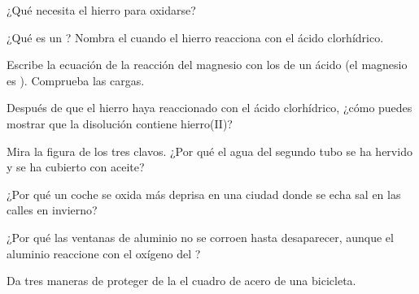 \begin{exercise}[$\star$]\label{exo:g9:metals-acids-corrosion:3}
¿Qué necesita el hierro para oxidarse?
\end{exercise}

\begin{exercise}[$\star$]\label{exo:g9:metals-acids-corrosion:4}
¿Qué es un ? Nombra el  cuando el hierro
reacciona con el ácido clorhídrico.
\end{exercise}

\begin{exercise}[$\star\star$]\label{exo:g9:metals-acids-corrosion:5}
Escribe la ecuación de la reacción del magnesio con los   de
un ácido (el  magnesio es ). Comprueba las cargas.
\end{exercise}

\begin{exercise}[$\star\star$]\label{exo:g9:metals-acids-corrosion:6}
Después de que el hierro haya reaccionado con el ácido clorhídrico,
¿cómo puedes mostrar que la disolución contiene  hierro(II)?
\end{exercise}

\begin{exercise}[$\star\star$]\label{exo:g9:metals-acids-corrosion:7}
Mira la figura de los tres clavos. ¿Por qué el agua del segundo tubo se
ha hervido y se ha cubierto con aceite?
\end{exercise}

\begin{exercise}[$\star\star$]\label{exo:g9:metals-acids-corrosion:8}
¿Por qué un coche se oxida más deprisa en una ciudad donde se echa sal
en las calles en invierno?
\end{exercise}

\begin{exercise}[$\star\star$]\label{exo:g9:metals-acids-corrosion:9}
¿Por qué las ventanas de aluminio no se corroen hasta desaparecer,
aunque el aluminio reaccione con el oxígeno del ?
\end{exercise}

\begin{exercise}[$\star\star$]\label{exo:g9:metals-acids-corrosion:10}
Da tres maneras de proteger de la  el cuadro de acero de una
bicicleta.
\end{exercise}

